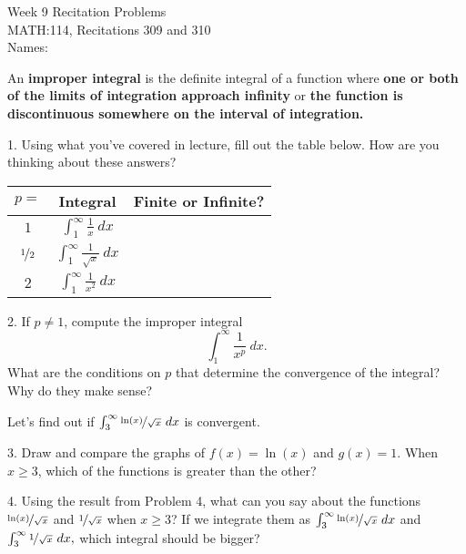 \documentclass[11pt]{article}
\begin{document}
	{
		\centering
		\huge{Week 9 Recitation Problems} \\
		\Large{MATH:114, Recitations 309 and 310} \\[2em]
	}
	\normalsize{Names:} \hrulefill
	\vspace{3em}
	
	An \textbf{improper integral} is the definite integral of a function where \textbf{one or both of the limits of integration approach infinity} or \textbf{the function is discontinuous somewhere on the interval of integration.}
	
	\vspace{0.05\textheight}
	
	1. Using what you've covered in lecture, fill out the table below. How are you thinking about these answers?
	
	\begin{table}[h]
		\centering
		\renewcommand{\arraystretch}{3}
		\begin{tabular}{|c|c|c|} \hline
			$p=$ & Integral & Finite or Infinite? \\ \hline
			$1$ & $ \displaystyle \int_1^\infty \frac 1x \ dx$ & \\ \hline
			$\nicefrac 12$ & $ \displaystyle \int_1^\infty \frac{1}{\sqrt x} \ dx$ & \\ \hline
			$2$ & $ \displaystyle \int_1^\infty \frac{1}{x^2} \ dx$ & \\ \hline
		\end{tabular}
	\end{table}
	
	\vspace{0.05\textheight}
	2. If $p \neq 1$, compute the improper integral $$ \int_1^\infty \frac{1}{x^p} \ dx. $$ What are the conditions on $p$ that determine the convergence of the integral? Why do they make sense?
	
	\vspace{0.1\textheight}
	\dotfill
	\vspace{2em}
	
	Let's find out if $ \int_3^\infty \nicefrac{\ln(x)}{\sqrt x} \ dx $ is convergent.
	
	\vspace{0.025\textheight}
	3. Draw and compare the graphs of $f(x) = \ln(x)$ and $g(x) = 1$. When $x \geq 3$, which of the functions is greater than the other?
	
	\vspace{0.1\textheight}
	
	4. Using the result from Problem 4, what can you say about the functions $ \nicefrac{\ln(x)}{\sqrt x}$ and $\nicefrac{1}{\sqrt x}$ when $x \geq 3$? If we integrate them as $ \int_3^\infty \nicefrac{\ln(x)}{\sqrt x} \ dx$ and $\int_3^\infty \nicefrac{1}{\sqrt x} \ dx,$ which integral should be bigger?
	
\end{document}
